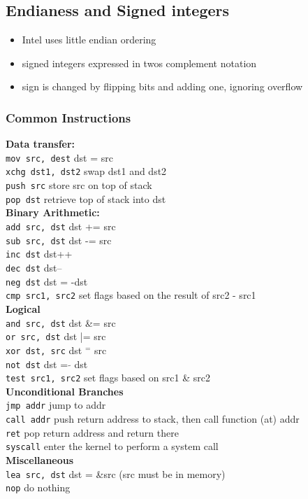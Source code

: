 \documentclass{article}
\begin{document}
\subsection{Endianess and Signed integers}
\begin{itemize}
    \item Intel uses little endian ordering
    \item signed integers expressed in twos complement notation
    \item sign is changed by flipping bits and adding one, ignoring overflow
\end{itemize}
\subsubsection{Common Instructions}
\textbf{Data transfer:}
\\\verb|mov src, dest| dst = src
\\\verb|xchg dst1, dst2| swap dst1 and dst2
\\\verb|push src| store src on top of stack
\\\verb|pop dst| retrieve top of stack into dst
\\\textbf{Binary Arithmetic:}
\\\verb|add src, dst| dst += src
\\\verb|sub src, dst| dst -= src
\\\verb|inc dst| dst++
\\\verb|dec dst| dst--
\\\verb|neg dst| dst = -dst
\\\verb|cmp src1, src2| set flags based on the result of src2 - src1
\\\textbf{Logical}
\\\verb|and src, dst| dst \&= src
\\\verb|or src, dst| dst |= src
\\\verb|xor dst, src| dst $^ =$ src
\\\verb|not dst| dst = $\tilde{}$ dst
\\\verb|test src1, src2| set flags based on src1 \& src2
\\\textbf{Unconditional Branches}
\\\verb|jmp addr| jump to addr
\\\verb|call addr| push return address to stack, then call function (at) addr
\\\verb|ret| pop return address and return there 
\\\verb|syscall| enter the kernel to perform a system call
\\\textbf{Miscellaneous}
\\\verb|lea src, dst| dst = \&src (src must be in memory)
\\\verb|nop| do nothing
\end{document}
